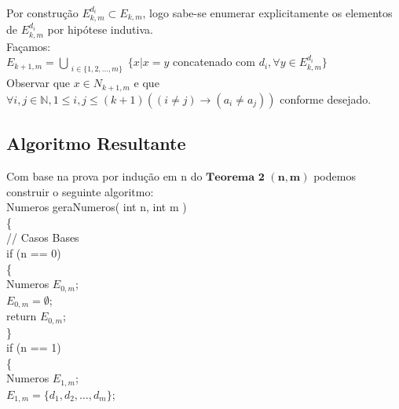 \documentclass[twoside]{article}
\begin{document}
\begin{multicols}{2}
Por construção $E_{k,m}^{d_i} \subset E_{k,m}$, logo sabe-se enumerar explicitamente os elementos de $E_{k,m}^{d_i}$ por hipótese indutiva.\\

Façamos:\\
 $E_{k+1,m} = \bigcup_{\substack{ i \in \{1,2,\dots,m\}}} \{ x | x = y$ concatenado com $d_i, \forall y \in E_{k,m}^{d_i}  \}$\\

Observar que $x \in N_{k+1,m}$ e que $\forall i,j \in \mathbb{N}, 1 \leq i,j \leq (k+1) ((i \neq j) \rightarrow ( a_i \neq a_j ))$ conforme desejado.\\


\subsection{ Algoritmo Resultante }
\indent 
Com base na prova por indução em n do $\mathbf{Teorema}$ $\mathbf{2}$ $\mathbf{(n,m)}$ podemos construir o seguinte algoritmo:\\
{\color[rgb]{0,0,1} Numeros} {\color[rgb]{0,0.5,0.5} geraNumeros}( {\color[rgb]{0,0,1} int} n, {\color[rgb]{0,0,1} int} m )\\
\{\\
\hspace*{5mm} {\color[rgb]{0,0.5,0}// Casos Bases}\\
\hspace*{5mm} {\color[rgb]{0.7,0.3,0} if} (n == 0)\\
\hspace*{5mm} \{\\
\hspace*{10mm} {\color[rgb]{0,0,1} Numeros} $E_{0,m}$;\\
\hspace*{10mm} $E_{0,m} = \emptyset$;\\
\hspace*{10mm} {\color[rgb]{0.5,0,1} return}  $E_{0,m}$;\\
\hspace*{5mm} \}\\
\hspace*{5mm} {\color[rgb]{0.7,0.3,0} if} (n == 1)\\
\hspace*{5mm} \{\\
\hspace*{10mm} {\color[rgb]{0,0,1} Numeros} $E_{1,m}$;\\
\hspace*{10mm} $E_{1,m} = \{d_1,d_2,\dots,d_m\}$;\\

\end{multicols}
\end{document}
